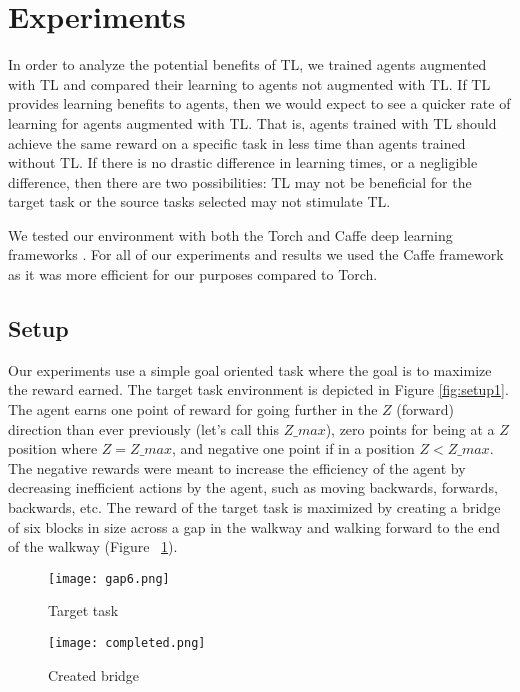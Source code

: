 \documentclass{llncs}
\begin{document}

\section{Experiments}\label{sec:experiments}


In order to analyze the potential benefits of TL, we trained agents augmented with TL and compared their learning to agents not augmented with TL. 
If TL provides learning benefits to agents, then we would expect to see a quicker rate of learning for agents augmented with TL.
That is, agents trained with TL should achieve the same reward on a specific task in less time than agents trained without TL. 
If there is no drastic difference in learning times, or a negligible difference, then there are two possibilities: TL may not be beneficial for the target task or the source tasks selected may not stimulate TL. 

We tested our environment with both the Torch and Caffe deep learning frameworks \citep{collobert2011torch7,jia2014caffe}. For all of our experiments and results we used the Caffe framework as it was more efficient for our purposes compared to Torch. 

\subsection{Setup}\label{subsec:setup}

Our experiments use a simple goal oriented task where the goal is to maximize the reward earned. 
The target task environment is depicted in Figure \ref{fig:setup1}.
The agent earns one point of reward for going further in the $Z$ (forward) direction than ever previously (let's call this $Z\_max$), zero points for being at a $Z$ position where $Z=Z\_max$, and negative one point if in a position $Z < Z\_max$.
The negative rewards were meant to increase the efficiency of the agent by decreasing inefficient actions by the agent, such as moving backwards, forwards, backwards, etc. 
The reward of the target task is maximized by creating a bridge of six blocks in size across a gap in the walkway and walking forward to the end of the walkway (Figure ~\ref{fig:setup2}). 

\begin{figure}[H]
  \centering
  \begin{minipage}[b]{0.45\textwidth}
    \texttt{[image: gap6.png]}
    \caption{Target task}
    \label{fig:setup1}
  \end{minipage}
  \hfill
  \begin{minipage}[b]{0.45\textwidth}
    \texttt{[image: completed.png]}
    \caption{Created bridge}
    \label{fig:setup2}
  \end{minipage}
\end{figure}
\end{document}
